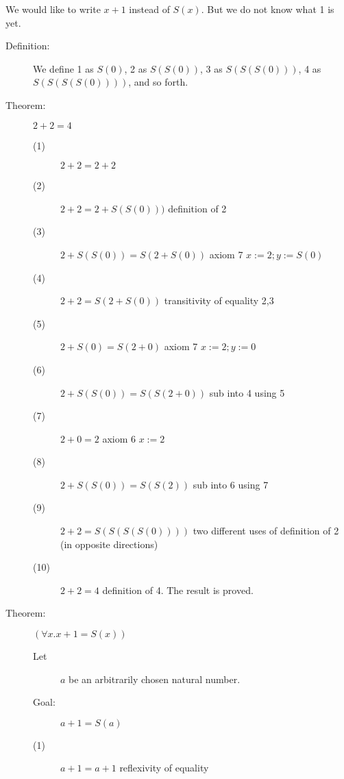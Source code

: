 \documentclass[12pt]{article}
\begin{document}
We would like to write $x+1$ instead of $S(x)$.  But we do not know what
1 is yet.

\begin{description}

\item[Definition:]  We define 1 as $S(0)$, 2 as $S(S(0))$, 3 as $S(S(S(0)))$,
4 as $S(S(S(S(0))))$, and so forth.

\item[Theorem:] $2+2=4$

\begin{description}

\item[(1)] $2+2 = 2+2$

\item[(2)] $2+2 = 2 + S(S(0)))$  definition of 2

\item[(3)] $2+S(S(0))=S(2+S(0))$  axiom 7 $x:=2; y:=S(0)$

\item[(4)]  $2+2 = S(2+S(0))$  transitivity of equality 2,3

\item[(5)] $2+S(0) = S(2+0)$  axiom 7 $x:=2; y:=0$

\item[(6)] $2+S(S(0)) = S(S(2+0))$ sub into 4 using 5

\item[(7)] $2+0=2$ axiom 6 $x:=2$

\item[(8)] $2+S(S(0)) = S(S(2))$ sub into 6 using 7

\item[(9)] $2+2 = S(S(S(S(0))))$  two different uses of definition of 2 (in opposite directions)

\item[(10)] $2+2=4$  definition of 4.  The result is proved.

\end{description}

\item[Theorem:]  $(\forall x.x+1 = S(x))$

\begin{description}

\item[Let] $a$ be an arbitrarily chosen natural number.

\item[Goal:]  $a+1=S(a)$

\item[(1)] $a+1 = a+1$  reflexivity of equality


\end{description}
\end{description}
\end{document}

